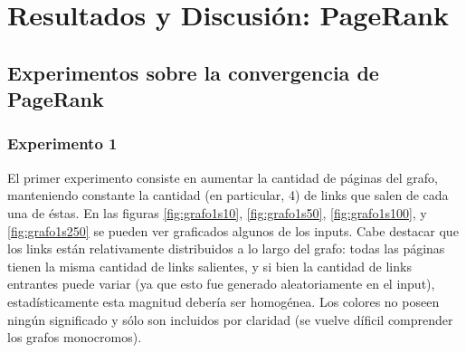 \section{Resultados y Discusi\'on: PageRank}
\subsection{Experimentos sobre la convergencia de PageRank}

\subsubsection{Experimento 1}
\par El primer experimento consiste en aumentar la cantidad de p\'aginas del grafo, manteniendo constante la cantidad (en particular, 4) de links que salen de cada una de \'estas.
En las figuras \ref{fig:grafo1s10}, \ref{fig:grafo1s50}, \ref{fig:grafo1s100}, y \ref{fig:grafo1s250} se pueden ver graficados algunos de los inputs.
Cabe destacar que los links est\'an relativamente distribuidos a lo largo del grafo: todas las p\'aginas tienen la misma cantidad de links salientes, y si bien la cantidad de links
entrantes puede variar (ya que esto fue generado aleatoriamente en el input), estad\'isticamente esta magnitud deber\'ia ser homog\'enea.
Los colores no poseen ning\'un significado y s\'olo son incluidos por claridad (se vuelve d\'ificil comprender los grafos monocromos).

\FloatBarrier
\begin{figure}[ht]
\qquad
{}
\end{figure}


